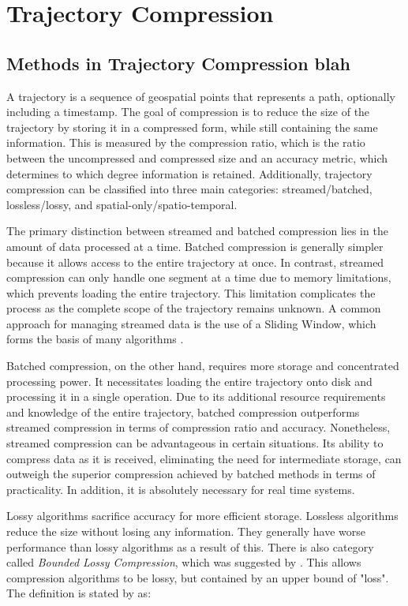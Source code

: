 \section{Trajectory Compression}
\label{sec:traj}
\subsection{Methods in Trajectory Compression blah}
A trajectory is a sequence of geospatial points that represents a path, optionally including a timestamp. The goal of compression is to reduce the size of the trajectory by storing it in a compressed form, while still containing the same information. This is measured by the compression ratio, which is the ratio between the uncompressed and compressed size and an accuracy metric, which determines to which degree information is retained. Additionally, trajectory compression can be classified into three main categories: streamed/batched, lossless/lossy, and spatial-only/spatio-temporal.

The primary distinction between streamed and batched compression lies in the amount of data processed at a time. Batched compression is generally simpler because it allows access to the entire trajectory at once. In contrast, streamed compression can only handle one segment at a time due to memory limitations, which prevents loading the entire trajectory. This limitation complicates the process as the complete scope of the trajectory remains unknown. A common approach for managing streamed data is the use of a Sliding Window, which forms the basis of many algorithms \cite{Sun2016}.

Batched compression, on the other hand, requires more storage and concentrated processing power. It necessitates loading the entire trajectory onto disk and processing it in a single operation. Due to its additional resource requirements and knowledge of the entire trajectory, batched compression outperforms streamed compression in terms of compression ratio and accuracy. Nonetheless, streamed compression can be advantageous in certain situations. Its ability to compress data as it is received, eliminating the need for intermediate storage, can outweigh the superior compression achieved by batched methods in terms of practicality. In addition, it is absolutely necessary for real time systems.

Lossy algorithms sacrifice accuracy for more efficient storage. Lossless algorithms reduce the size without losing any information. They generally have worse performance than lossy algorithms as a result of this. There is also category called \textit{Bounded Lossy Compression}, which was suggested by \textcite{zhao2018rest}. This allows compression algorithms to be lossy, but contained by an upper bound of "loss". The definition is stated by \textcite{zhao2018rest} as:

